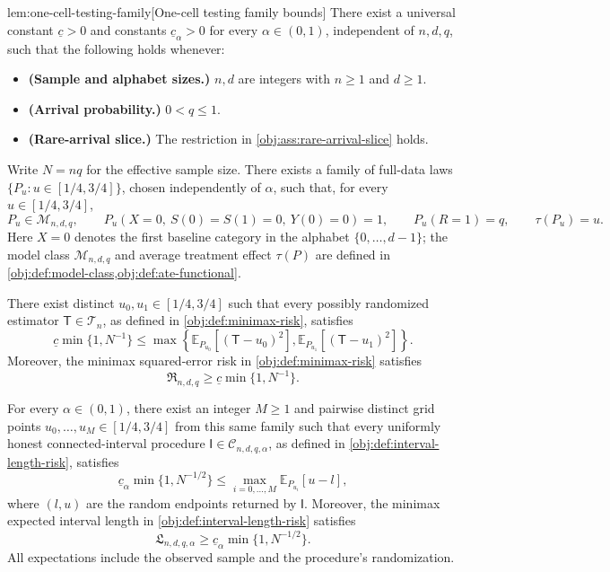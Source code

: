 \documentclass[11pt]{article}
\begin{document}
\begin{lemmav}{lem:one-cell-testing-family}[One-cell testing family bounds]
There exist a universal constant \(\underline c>0\) and constants \(\underline c_\alpha>0\) for every \(\alpha\in(0,1)\), independent of \(n,d,q\), such that the following holds whenever:
\begin{itemize}
\item \textbf{(Sample and alphabet sizes.)} \(n,d\) are integers with \(n\ge1\) and \(d\ge1\).
\item \textbf{(Arrival probability.)} \(0<q\le1\).
\item \textbf{(Rare-arrival slice.)} The restriction in \cref{obj:ass:rare-arrival-slice} holds.
\end{itemize}
Write \(N=nq\) for the effective sample size. There exists a family of full-data laws \(\{P_u:u\in[1/4,3/4]\}\), chosen independently of \(\alpha\), such that, for every \(u\in[1/4,3/4]\),
\[
P_u\in\mathcal M_{n,d,q},\qquad
P_u\!\left(X=0,\ S(0)=S(1)=0,\ Y(0)=0\right)=1,
\qquad
P_u(R=1)=q,\qquad
\tau(P_u)=u.
\]
Here \(X=0\) denotes the first baseline category in the alphabet \(\{0,\ldots,d-1\}\); the model class \(\mathcal M_{n,d,q}\) and average treatment effect \(\tau(P)\) are defined in \cref{obj:def:model-class,obj:def:ate-functional}.

There exist distinct \(u_0,u_1\in[1/4,3/4]\) such that every possibly randomized estimator \(\mathsf T\in\mathcal T_n\), as defined in \cref{obj:def:minimax-risk}, satisfies
\[
\underline c\min\{1,N^{-1}\}
\le
\max\left\{
\mathbb E_{P_{u_0}}\!\left[(\mathsf T-u_0)^2\right],
\mathbb E_{P_{u_1}}\!\left[(\mathsf T-u_1)^2\right]
\right\}.
\]
Moreover, the minimax squared-error risk in \cref{obj:def:minimax-risk} satisfies
\[
\mathfrak R_{n,d,q}\ge
\underline c\min\{1,N^{-1}\}.
\]

For every \(\alpha\in(0,1)\), there exist an integer \(M\ge1\) and pairwise distinct grid points \(u_0,\ldots,u_M\in[1/4,3/4]\) from this same family such that every uniformly honest connected-interval procedure \(\mathsf I\in\mathcal C_{n,d,q,\alpha}\), as defined in \cref{obj:def:interval-length-risk}, satisfies
\[
\underline c_\alpha\min\{1,N^{-1/2}\}
\le
\max_{i=0,\ldots,M}\mathbb E_{P_{u_i}}[u-l],
\]
where \((l,u)\) are the random endpoints returned by \(\mathsf I\). Moreover, the minimax expected interval length in \cref{obj:def:interval-length-risk} satisfies
\[
\mathfrak L_{n,d,q,\alpha}\ge
\underline c_\alpha\min\{1,N^{-1/2}\}.
\]
All expectations include the observed sample and the procedure's randomization.
\end{lemmav}
\end{document}
